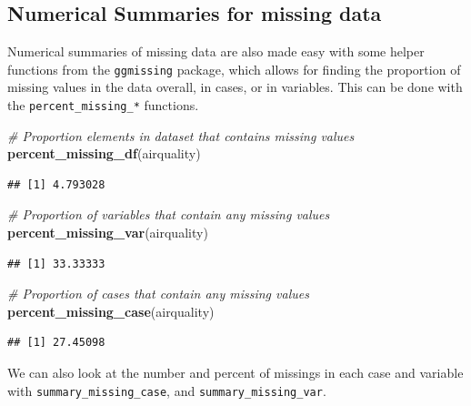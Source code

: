 \documentclass[]{article}
\newenvironment{Shaded}{\begin{snugshade}}{\end{snugshade}}
\newcommand{\KeywordTok}[1]{\textcolor[rgb]{0.13,0.29,0.53}{\textbf{{#1}}}}
\newcommand{\DecValTok}[1]{\textcolor[rgb]{0.00,0.00,0.81}{{#1}}}
\newcommand{\StringTok}[1]{\textcolor[rgb]{0.31,0.60,0.02}{{#1}}}
\newcommand{\CommentTok}[1]{\textcolor[rgb]{0.56,0.35,0.01}{\textit{{#1}}}}
\newcommand{\NormalTok}[1]{{#1}}
\begin{document}
\subsection{Numerical Summaries for missing
data}\label{numerical-summaries-for-missing-data}

Numerical summaries of missing data are also made easy with some helper
functions from the \texttt{ggmissing} package, which allows for finding
the proportion of missing values in the data overall, in cases, or in
variables. This can be done with the \texttt{percent\_missing\_*}
functions.

\begin{Shaded}
\begin{Highlighting}[]
\CommentTok{# Proportion elements in dataset that contains missing values}
\KeywordTok{percent_missing_df}\NormalTok{(airquality)}
\end{Highlighting}
\end{Shaded}

\begin{verbatim}
## [1] 4.793028
\end{verbatim}

\begin{Shaded}
\begin{Highlighting}[]
\CommentTok{# Proportion of variables that contain any missing values}
\KeywordTok{percent_missing_var}\NormalTok{(airquality)}
\end{Highlighting}
\end{Shaded}

\begin{verbatim}
## [1] 33.33333
\end{verbatim}

\begin{Shaded}
\begin{Highlighting}[]
 \CommentTok{# Proportion of cases that contain any missing values}
\KeywordTok{percent_missing_case}\NormalTok{(airquality)}
\end{Highlighting}
\end{Shaded}

\begin{verbatim}
## [1] 27.45098
\end{verbatim}

We can also look at the number and percent of missings in each case and
variable with \texttt{summary\_missing\_case}, and
\texttt{summary\_missing\_var}.

\begin{Shaded}
\end{Shaded}
\end{document}
